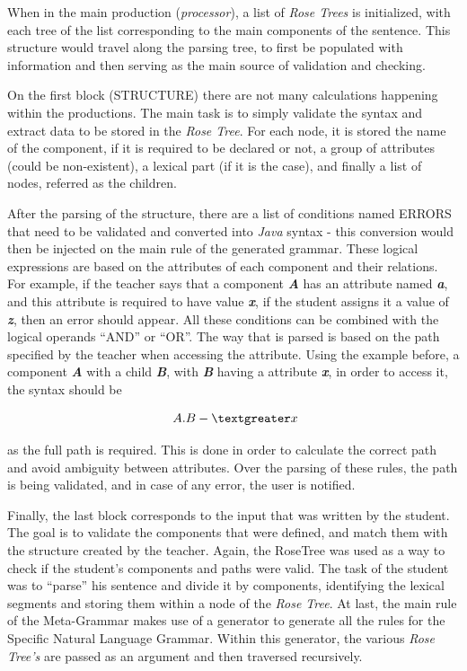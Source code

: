 When in the main production (\emph{processor}), a list of \emph{Rose Trees} is initialized, with each tree of the list corresponding to the main components of the sentence. This structure would travel along the parsing tree, to first be populated with information and then serving as the main source of validation and checking.

On the first block (STRUCTURE) there are not many calculations happening within the productions. 
The main task is to simply validate the syntax and extract data to be stored in the \emph{Rose Tree}. 
For each node, it is stored the name of the component, if it is required to be declared or not, a group of attributes (could be non-existent), 
a lexical part (if it is the case), and finally a list of nodes, referred as the children.

After the parsing of the structure, there are a list of conditions named ERRORS that need to be validated and converted into \emph{Java} syntax - this conversion would then be injected on the main rule of the generated grammar. These logical expressions are based on the attributes of each component and their relations. For example, if the teacher says that a component \emph{\textbf{A}} has an attribute named \emph{\textbf{a}}, and this attribute is required to have value \emph{\textbf{x}}, if the student assigns it a value of \emph{\textbf{z}}, then an error should appear. All these conditions can be combined with the logical operands ``AND'' or ``OR''. The way that is parsed is based on the path specified by the teacher when accessing the attribute. Using the example before, a component \emph{\textbf{A}} with a child \emph{\textbf{B}}, with \emph{\textbf{B}} having a attribute \emph{\textbf{x}}, in order to access it, the syntax should be

\[ A.B -\textgreater x \]

\noindent as the full path is required. This is done in order to calculate the correct path and avoid ambiguity between attributes. Over the parsing of these rules, the path is being validated, and in case of any error, the user is notified.

Finally, the last block corresponds to the input that was written by the student. 
The goal is to validate the components that were defined, and match them with the structure created by the teacher. 
Again, the RoseTree was used as a way to check if the student’s components and paths were valid. 
The task of the student was to ``parse'' his sentence and divide it by components, identifying the lexical segments and storing them within a node of the \emph{Rose Tree}. 
At last, the main rule of the Meta-Grammar makes use of a generator to generate all the rules for the Specific Natural Language Grammar. 
Within this generator, the various \emph{Rose Tree's} are passed as an argument and then traversed recursively.


